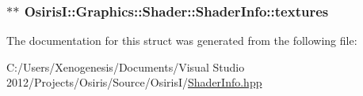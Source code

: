 \hypertarget{struct_osiris_i_1_1_graphics_1_1_shader_1_1_shader_info_a5a12769ed7c4f700599977bb3418122e}{
\subsubsection[{textures}]{$\ast$$\ast$ Osiris\-I\-::\-Graphics\-::\-Shader\-::\-Shader\-Info\-::textures}}\label{struct_osiris_i_1_1_graphics_1_1_shader_1_1_shader_info_a5a12769ed7c4f700599977bb3418122e}


The documentation for this struct was generated from the following file\-:\begin{DoxyCompactItemize}
\item 
C\-:/\-Users/\-Xenogenesis/\-Documents/\-Visual Studio 2012/\-Projects/\-Osiris/\-Source/\-Osiris\-I/\hyperlink{_shader_info_8hpp}{Shader\-Info.\-hpp}\end{DoxyCompactItemize}
